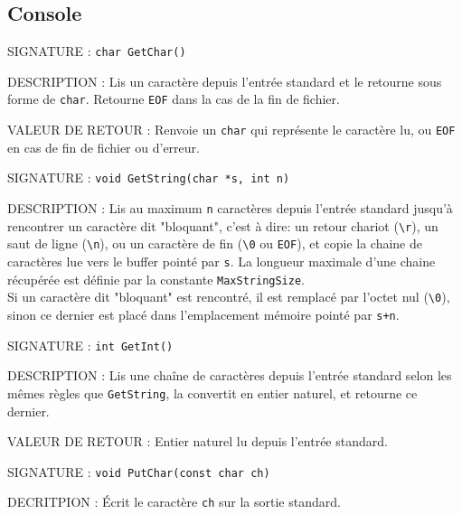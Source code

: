 \documentclass{article}
\begin{document}
	\subsection{Console}
		\begin{description}
			\item{SIGNATURE : } \texttt{char GetChar()}
			\item{DESCRIPTION :}{ Lis un caractère depuis l'entrée standard et le retourne sous forme de \texttt{char}. Retourne \texttt{EOF} dans la cas de la fin de fichier.}
			\item{VALEUR DE RETOUR : } Renvoie un \texttt{char} qui représente le caractère lu, ou \texttt{EOF} en cas de fin de fichier ou d'erreur.
		\end{description}
		\vspace{2.5mm}
		\begin{description}
			\item{SIGNATURE : } \texttt{void GetString(char *s, int n)}
			\item{DESCRIPTION : } Lis au maximum \texttt{n} caractères depuis l'entrée standard jusqu'à rencontrer un caractère dit "bloquant", c'est à dire: un retour chariot (\texttt{\textbackslash{}r}), un saut de ligne (\texttt{\textbackslash{}n}), ou un caractère de fin (\texttt{\textbackslash{}0} ou \texttt{EOF}), et copie la chaine de caractères lue vers le buffer pointé par \texttt{s}. La longueur maximale d'une chaine récupérée est définie par la constante \texttt{MaxStringSize}. \\Si un caractère dit "bloquant" est rencontré, il est remplacé par l'octet nul (\texttt{\textbackslash{}0}), sinon ce dernier est placé dans l'emplacement mémoire pointé par \texttt{s+n}.
		\end{description}
		\vspace{2.5mm}
		\begin{description}
			\item{SIGNATURE : } \texttt{int GetInt()}
			\item{DESCRIPTION : } Lis une chaîne de caractères depuis l'entrée standard selon les mêmes règles que \texttt{GetString}, la convertit en entier naturel, et retourne ce dernier.
			\item{VALEUR DE RETOUR : } Entier naturel lu depuis l'entrée standard.
		\end{description}
		\vspace{2.5mm}
		\begin{description}
			\item{SIGNATURE : } \texttt{void PutChar(const char ch)}
			\item{DECRITPION : } Écrit le caractère \texttt{ch} sur la sortie standard. 
		\end{description}
\end{document}

